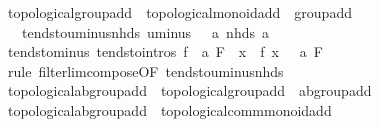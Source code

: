 \begin{isabellebody}
{}
\isamarkuptrue%
%
\endisatagdocument
{\isafolddocument}%
%
\isadelimdocument
%
\endisadelimdocument
{}\isamarkupfalse%
\ topological{\isacharunderscore}{\kern0pt}group{\isacharunderscore}{\kern0pt}add\ {\isacharequal}{\kern0pt}\ topological{\isacharunderscore}{\kern0pt}monoid{\isacharunderscore}{\kern0pt}add\ {\isacharplus}{\kern0pt}\ group{\isacharunderscore}{\kern0pt}add\ {\isacharplus}{\kern0pt}\isanewline
\ \ \ tendsto{\isacharunderscore}{\kern0pt}uminus{\isacharunderscore}{\kern0pt}nhds{\isacharcolon}{\kern0pt}\ {\isachardoublequoteopen}{\isacharparenleft}{\kern0pt}uminus\ {\isasymlonglongrightarrow}\ {\isacharminus}{\kern0pt}\ a{\isacharparenright}{\kern0pt}\ {\isacharparenleft}{\kern0pt}nhds\ a{\isacharparenright}{\kern0pt}{\isachardoublequoteclose}\isanewline
{}\isanewline
\isanewline
{}\isamarkupfalse%
\ tendsto{\isacharunderscore}{\kern0pt}minus\ {\isacharbrackleft}{\kern0pt}tendsto{\isacharunderscore}{\kern0pt}intros{\isacharbrackright}{\kern0pt}{\isacharcolon}{\kern0pt}\ {\isachardoublequoteopen}{\isacharparenleft}{\kern0pt}f\ {\isasymlonglongrightarrow}\ a{\isacharparenright}{\kern0pt}\ F\ {\isasymLongrightarrow}\ {\isacharparenleft}{\kern0pt}{\isacharparenleft}{\kern0pt}{\isasymlambda}x{\isachardot}{\kern0pt}\ {\isacharminus}{\kern0pt}\ f\ x{\isacharparenright}{\kern0pt}\ {\isasymlonglongrightarrow}\ {\isacharminus}{\kern0pt}\ a{\isacharparenright}{\kern0pt}\ F{\isachardoublequoteclose}\isanewline
%
\isadelimproof
\ \ %
\endisadelimproof
%
\isatagproof
{}\isamarkupfalse%
\ {\isacharparenleft}{\kern0pt}rule\ filterlim{\isacharunderscore}{\kern0pt}compose{\isacharbrackleft}{\kern0pt}OF\ tendsto{\isacharunderscore}{\kern0pt}uminus{\isacharunderscore}{\kern0pt}nhds{\isacharbrackright}{\kern0pt}{\isacharparenright}{\kern0pt}%
\endisatagproof
{\isafoldproof}%
%
\isadelimproof
\isanewline
%
\endisadelimproof
\isanewline
{}\isamarkupfalse%
\isanewline
\isanewline
{}\isamarkupfalse%
\ topological{\isacharunderscore}{\kern0pt}ab{\isacharunderscore}{\kern0pt}group{\isacharunderscore}{\kern0pt}add\ {\isacharequal}{\kern0pt}\ topological{\isacharunderscore}{\kern0pt}group{\isacharunderscore}{\kern0pt}add\ {\isacharplus}{\kern0pt}\ ab{\isacharunderscore}{\kern0pt}group{\isacharunderscore}{\kern0pt}add\isanewline
\isanewline
{}\isamarkupfalse%
\ topological{\isacharunderscore}{\kern0pt}ab{\isacharunderscore}{\kern0pt}group{\isacharunderscore}{\kern0pt}add\ {\isacharless}{\kern0pt}\ topological{\isacharunderscore}{\kern0pt}comm{\isacharunderscore}{\kern0pt}monoid{\isacharunderscore}{\kern0pt}add%

\end{isabellebody}
